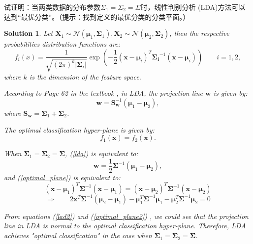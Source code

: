 \documentclass[a4paper,UTF8]{article}
\numberwithin{equation}{section}
\newtheorem*{solution}{Solution}
\begin{document}
试证明：当两类数据的分布参数$\Sigma_1=\Sigma_2=\Sigma$时，线性判别分析 (LDA)方法可以达到“最优分类”。（提示：找到定义的最优分类的分类平面。）
\begin{solution}
Let  $\mathbf{X}_1 \sim \mathcal{N}(\bm{\mu}_1,\bm{\Sigma}_1), \mathbf{X}_2 \sim \mathcal{N}(\bm{\mu}_2,\bm{\Sigma}_2)$, then the respective probabilities distribution functions are:
\begin{equation*}
f_i (x) = \frac{1}{\sqrt{(2 \pi)^k |\bm{\Sigma}_i| }} \exp(-\frac{1}{2} (\mathbf{x} - \bm{\mu}_i)^T \bm{\Sigma_i} ^{-1} (\mathbf{x} - \bm{\mu}_i) ) \quad \quad i = 1, 2,
\end{equation*}
where $k$ is the dimension of the feature space.

According to Page 62 in the textbook , in LDA, the projection line $\mathbf{w}$ is given by:
\begin{equation}\label{lda}
\mathbf{w} = \mathbf{S}_\mathbf{w} ^{-1} (\bm{\mu}_1-\bm{\mu}_2),
\end{equation}
where $\mathbf{S}_\mathbf{w} = \bm{\Sigma}_1 + \bm{\Sigma}_2$.


The optimal classification hyper-plane is given by:
\begin{equation} \label{optimal_plane}
f_1(\mathbf{x}) = f_2(\mathbf{x}) .
\end{equation}

When $\bm{\Sigma}_1 = \bm{\Sigma}_2 = \bm{\Sigma}$,
(\ref{lda}) is equivalent to:
\begin{equation}\label{lad2}
\mathbf{w} = \frac{1}{2} \bm{\Sigma} ^{-1} (\bm{\mu}_1-\bm{\mu}_2),
\end{equation}
 and (\ref{optimal_plane}) is equivalent to:
\begin{equation*}
(\mathbf{x} - \bm{\mu}_1)^T \bm{\Sigma} ^{-1} (\mathbf{x} - \bm{\mu}_1) = (\mathbf{x} - \bm{\mu}_2)^T \bm{\Sigma} ^{-1} (\mathbf{x} - \bm{\mu}_2) 
\end{equation*}
\begin{equation}\label{optimal_plane2}
\Rightarrow  \quad \quad 2\mathbf{x}^T \bm{\Sigma}^{-1} (\bm{\mu}_2 - \bm{\mu}_1) - \bm{\mu}_1 ^T \bm{\Sigma}^{-1}\bm{\mu}_1 - \bm{\mu}_2 ^T \bm{\Sigma}^{-1} \bm{\mu}_2 =0
\end{equation}

From equations (\ref{lad2}) and (\ref{optimal_plane2}) , we could see that the projection line in LDA is normal to the optimal classification hyper-plane. Therefore, LDA achieves "optimal classification" in the case when $\bm{\Sigma}_1 = \bm{\Sigma}_2 = \bm{\Sigma}$.
\end{solution}
\newpage
\end{document}
